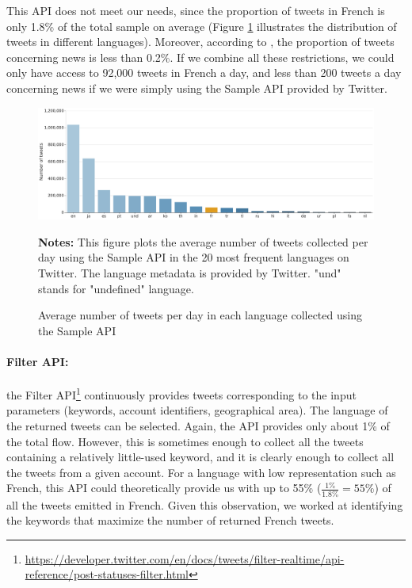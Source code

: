 This API does not meet our needs, since the proportion of tweets in French is only 1.8\% of the total sample on average
(Figure \ref{Figure:HistogramLanguages} illustrates the distribution of tweets in different languages). Moreover, according to \citet{liu_reuters_2016}, the proportion of tweets concerning news is less than 0.2\%. If we combine all these restrictions, we could only have access to 92,000 tweets in French a day, and less than 200 tweets a day concerning news if we were simply using the Sample API provided by Twitter.


\begin{figure}
\begin{center}
\includegraphics[width=1\textwidth]{figures/HistogramLanguages.pdf}
\end{center}
{\scriptsize \textbf{Notes:} This figure plots the average number of tweets collected  per day using the Sample API in the 20 most frequent languages on Twitter. The language metadata is provided by Twitter. "und" stands for "undefined" language.}
\caption{Average number of tweets per day in each language collected using the Sample API}
\label{Figure:HistogramLanguages}
\end{figure}


\paragraph{Filter API:}

the Filter API\footnote{\url{https://developer.twitter.com/en/docs/tweets/filter-realtime/api-reference/post-statuses-filter.html}} continuously provides tweets corresponding to the input parameters (keywords, account identifiers, geographical area). The language of the returned tweets can be selected. Again, the API provides only about 1\% of the total flow. However, this is sometimes enough to collect all the tweets containing a relatively little-used keyword, and it is clearly enough to collect all the tweets from a given account. For a language with low representation such as French, this API could theoretically provide us with up to 55\% ($\frac{1\%}{1.8\%} = 55\%$) of all the tweets emitted in French. Given this observation, we worked at identifying the keywords that maximize the number of returned French tweets.


